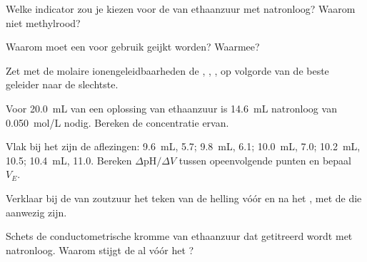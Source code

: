 \begin{exercise}[$\star$]\label{exo:g12:ph-conductivity-titrations:3}
Welke indicator zou je kiezen voor de  van ethaanzuur met
natronloog? Waarom niet methylrood?
\end{exercise}

\begin{exercise}[$\star$]\label{exo:g12:ph-conductivity-titrations:4}
Waarom moet een  voor gebruik geijkt worden? Waarmee?
\end{exercise}

\begin{exercise}[$\star$]\label{exo:g12:ph-conductivity-titrations:5}
Zet met de molaire ionengeleidbaarheden de  , ,
,  op volgorde van de beste geleider naar de slechtste.
\end{exercise}

\begin{exercise}[$\star\star$]\label{exo:g12:ph-conductivity-titrations:6}
Voor \qty{20.0}{mL} van een oplossing van ethaanzuur is \qty{14.6}{mL}
natronloog van \qty{0.050}{mol/L} nodig. Bereken de concentratie ervan.
\end{exercise}

\begin{exercise}[$\star\star$]\label{exo:g12:ph-conductivity-titrations:7}
Vlak bij het  zijn de aflezingen: \qty{9.6}{mL},  5.7;
\qty{9.8}{mL}, 6.1; \qty{10.0}{mL}, 7.0; \qty{10.2}{mL}, 10.5;
\qty{10.4}{mL}, 11.0. Bereken $\Delta\mathrm{pH}/\Delta V$ tussen
opeenvolgende punten en bepaal $V_E$.
\end{exercise}

\begin{exercise}[$\star\star$]\label{exo:g12:ph-conductivity-titrations:8}
Verklaar bij de  van zoutzuur het teken van de
helling vóór en na het , met de  die aanwezig zijn.
\end{exercise}

\begin{exercise}[$\star\star$]\label{exo:g12:ph-conductivity-titrations:9}
Schets de conductometrische kromme van ethaanzuur dat getitreerd wordt met
natronloog. Waarom stijgt de  al vóór het ?
\end{exercise}

